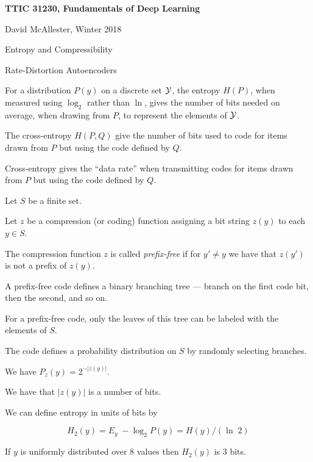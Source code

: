 





{\Huge

  \centerline{\bf TTIC 31230, Fundamentals of Deep Learning}
  \bigskip
  \centerline{David McAllester, Winter 2018}
  \vfill
  \centerline{Entropy and Compressibility}
  \vfill
  \centerline{Rate-Distortion Autoencoders}


For a distribution $P(y)$ on a discrete set ${\cal Y}$, the entropy $H(P)$, when measured using $\log_2$ rather than $\ln$, gives the number of bits needed
on average, when drawing from $P$, to represent the elements of ${\cal Y}$.

\vfill
The cross-entropy $H(P,Q)$ give the number of bits used to code for items drawn from $P$ but using the code defined by $Q$.

\vfill
Cross-entropy gives the ``data rate'' when transmitting codes for items drawn from $P$ but using the code defined by $Q$.


Let $S$ be a finite set.

\vfill
Let $z$ be a compression (or coding) function  assigning a bit string $z(y)$ to each $y \in S$.

\vfill
The compression function $z$ is called {\em prefix-free} if for $y' \not = y$ we have that $z(y')$ is not a prefix of $z(y)$.


A prefix-free code defines a binary branching tree --- branch on the first code bit, then the second, and so on.

\vfill
For a prefix-free code, only the leaves of this tree can be labeled with the elements of $S$.

\vfill
The code defines a probability distribution on $S$ by randomly selecting branches.

\vfill
We have $P_z(y) = 2^{-|z(y)|}$.


We have that $|z(y)|$ is a number of bits.

\vfill
We can define entropy in units of bits by

\vfill
$$H_2(y) = E_y\; - \log_2 P(y) = H(y)/(\ln \;2)$$

\vfill
If $y$ is uniformly distributed over 8 values then $H_2(y)$ is 3 bits.

}
